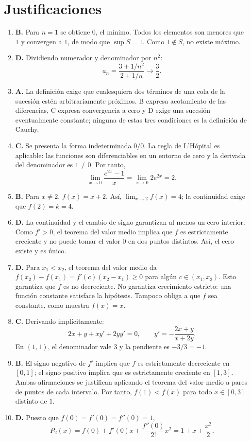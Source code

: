 \documentclass[11pt,a4paper]{article}
\begin{document}
\section*{Justificaciones}
\begin{enumerate}
\item \textbf{B.} Para $n=1$ se obtiene $0$, el mínimo. Todos los elementos
son menores que $1$ y convergen a $1$, de modo que $\sup S=1$.
Como $1\notin S$, no existe máximo.

\item \textbf{D.} Dividiendo numerador y denominador por $n^2$:
\[
a_n=\frac{3+1/n^2}{2+1/n}\longrightarrow\frac{3}{2}.
\]

\item \textbf{A.} La definición exige que cualesquiera dos términos de una
cola de la sucesión estén arbitrariamente próximos. B expresa acotamiento
de las diferencias, C expresa convergencia a cero y D exige una sucesión
eventualmente constante; ninguna de estas tres condiciones es la definición
de Cauchy.

\item \textbf{C.} Se presenta la forma indeterminada $0/0$. La regla de
L'Hópital es aplicable: las funciones son diferenciables en un entorno de
cero y la derivada del denominador es $1\neq0$. Por tanto,
\[
\lim_{x\to0}\frac{e^{2x}-1}{x}
=\lim_{x\to0}2e^{2x}=2.
\]

\item \textbf{B.} Para $x\neq2$, $f(x)=x+2$. Así,
$\lim_{x\to2}f(x)=4$; la continuidad exige que $f(2)=k=4$.

\item \textbf{D.} La continuidad y el cambio de signo
garantizan al menos un cero interior. Como $f'>0$, el teorema del valor
medio implica que $f$ es estrictamente creciente y no puede tomar el
valor $0$ en dos puntos distintos. Así, el cero existe y es único.

\item \textbf{D.} Para $x_1<x_2$, el teorema del valor medio
da $f(x_2)-f(x_1)=f'(c)(x_2-x_1)\geq0$ para algún $c\in(x_1,x_2)$.
Esto garantiza que $f$ es no decreciente. No garantiza crecimiento
estricto: una función constante satisface la hipótesis. Tampoco obliga
a que $f$ sea constante, como muestra $f(x)=x$.

\item \textbf{C.} Derivando implícitamente:
\[
2x+y+xy'+2yy'=0,
\qquad y'=-\frac{2x+y}{x+2y}.
\]
En $(1,1)$, el denominador vale $3$ y la pendiente es $-3/3=-1$.

\item \textbf{B.} El signo negativo de $f'$ implica que $f$
es estrictamente decreciente en $[0,1]$; el signo positivo implica que es
estrictamente creciente en $[1,3]$. Ambas afirmaciones se justifican
aplicando el teorema del valor medio a pares de puntos de cada intervalo.
Por tanto, $f(1)<f(x)$ para todo $x\in[0,3]$ distinto de $1$.

\item \textbf{D.} Puesto que $f(0)=f'(0)=f''(0)=1$,
\[
P_2(x)=f(0)+f'(0)x+\frac{f''(0)}{2!}x^2
=1+x+\frac{x^2}{2}.
\]
\end{enumerate}
\fi
\end{document}
